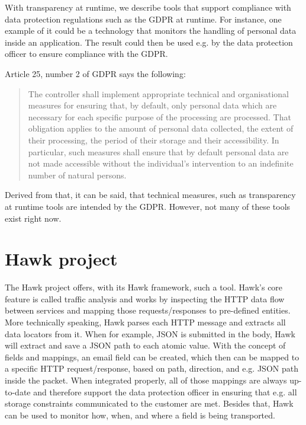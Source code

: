 



\graphicspath{{4/figures/}}

With transparency at runtime, we describe tools that support compliance with data protection regulations such as the GDPR at runtime. For instance, one example of it could be a technology that monitors the handling of personal data inside an application.  The result could then be used e.g. by the data protection officer to ensure compliance with the GDPR.

Article 25, number 2 of GDPR says the following:
\begin{quote}
    The controller shall implement appropriate technical and organisational measures for ensuring that, by default, only personal data which are necessary for each specific purpose of the processing are processed. That obligation applies to the amount of personal data collected, the extent of their processing, the period of their storage and their accessibility. In particular, such measures shall ensure that by default personal data are not made accessible without the individual's intervention to an indefinite number of natural persons.
\end{quote}

Derived from that, it can be said, that technical measures, such as transparency at runtime tools are intended by the GDPR.
However, not many of these tools exist right now.

\section{Hawk project}
The Hawk project offers, with its Hawk framework, such a tool. Hawk's core feature is called traffic analysis and works by inspecting the HTTP data flow between services and mapping those requests/responses to pre-defined entities. More technically speaking, Hawk parses each HTTP message and extracts all data locators from it. When for example, JSON is submitted in the body, Hawk will extract and save a JSON path to each atomic value. With the concept of fields and mappings, an email field can be created, which then can be mapped to a specific HTTP request/response, based on path, direction, and e.g. JSON path inside the packet. When integrated properly, all of those mappings are always up-to-date and therefore support the data protection officer in ensuring that e.g. all storage constraints communicated to the customer are met. Besides that, Hawk can be used to monitor how, when, and where a field is being transported.


